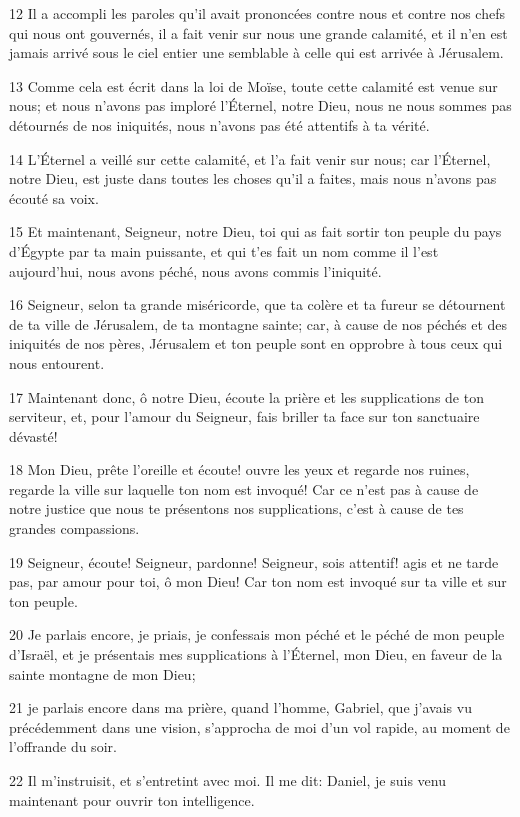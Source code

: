 \par 12 Il a accompli les paroles qu'il avait prononcées contre nous et contre nos chefs qui nous ont gouvernés, il a fait venir sur nous une grande calamité, et il n'en est jamais arrivé sous le ciel entier une semblable à celle qui est arrivée à Jérusalem.
\par 13 Comme cela est écrit dans la loi de Moïse, toute cette calamité est venue sur nous; et nous n'avons pas imploré l'Éternel, notre Dieu, nous ne nous sommes pas détournés de nos iniquités, nous n'avons pas été attentifs à ta vérité.
\par 14 L'Éternel a veillé sur cette calamité, et l'a fait venir sur nous; car l'Éternel, notre Dieu, est juste dans toutes les choses qu'il a faites, mais nous n'avons pas écouté sa voix.
\par 15 Et maintenant, Seigneur, notre Dieu, toi qui as fait sortir ton peuple du pays d'Égypte par ta main puissante, et qui t'es fait un nom comme il l'est aujourd'hui, nous avons péché, nous avons commis l'iniquité.
\par 16 Seigneur, selon ta grande miséricorde, que ta colère et ta fureur se détournent de ta ville de Jérusalem, de ta montagne sainte; car, à cause de nos péchés et des iniquités de nos pères, Jérusalem et ton peuple sont en opprobre à tous ceux qui nous entourent.
\par 17 Maintenant donc, ô notre Dieu, écoute la prière et les supplications de ton serviteur, et, pour l'amour du Seigneur, fais briller ta face sur ton sanctuaire dévasté!
\par 18 Mon Dieu, prête l'oreille et écoute! ouvre les yeux et regarde nos ruines, regarde la ville sur laquelle ton nom est invoqué! Car ce n'est pas à cause de notre justice que nous te présentons nos supplications, c'est à cause de tes grandes compassions.
\par 19 Seigneur, écoute! Seigneur, pardonne! Seigneur, sois attentif! agis et ne tarde pas, par amour pour toi, ô mon Dieu! Car ton nom est invoqué sur ta ville et sur ton peuple.
\par 20 Je parlais encore, je priais, je confessais mon péché et le péché de mon peuple d'Israël, et je présentais mes supplications à l'Éternel, mon Dieu, en faveur de la sainte montagne de mon Dieu;
\par 21 je parlais encore dans ma prière, quand l'homme, Gabriel, que j'avais vu précédemment dans une vision, s'approcha de moi d'un vol rapide, au moment de l'offrande du soir.
\par 22 Il m'instruisit, et s'entretint avec moi. Il me dit: Daniel, je suis venu maintenant pour ouvrir ton intelligence.
